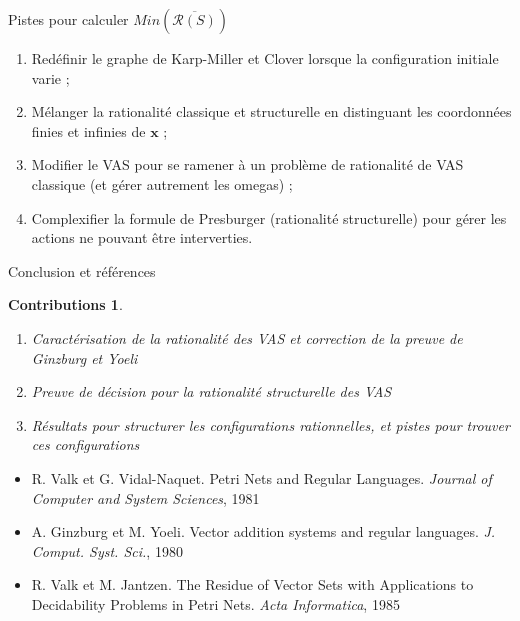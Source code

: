 \documentclass[french]{beamer}
\newcommand{\Min}{\textit{Min}}
\newcommand{\vect}[1]{\ensuremath{\mathbf{#1}}}
\newcommand{\inirat}{\mathcal{R}}
\newtheorem{summary}{Contributions}
\begin{document}
\begin{frame}{Pistes pour calculer $\Min(\overline{\inirat(S)})$}
\begin{enumerate}
    \item Redéfinir le graphe de Karp-Miller et Clover lorsque la configuration initiale varie ;
    \item Mélanger la rationalité classique et structurelle en distinguant les coordonnées finies et infinies de $\vect{x}$ ;
    \item Modifier le VAS pour se ramener à un problème de rationalité de VAS classique (et gérer autrement les omegas) ;
    \item Complexifier la formule de Presburger (rationalité structurelle) pour gérer les actions ne pouvant être interverties.
\end{enumerate}
\end{frame}

\begin{frame}{Conclusion et références}

\begin{summary}
\begin{enumerate}
    \item Caractérisation de la rationalité des VAS et correction de la preuve de Ginzburg et Yoeli
    \item Preuve de décision pour la rationalité structurelle des VAS
    \item Résultats pour structurer les configurations rationnelles, et pistes pour trouver ces configurations
\end{enumerate}
\end{summary}

\vspace{5mm}
\footnotesize{
\begin{itemize}
    \item R. Valk et G. Vidal-Naquet.
    Petri Nets and Regular Languages.
    \textit{Journal of Computer and System Sciences}, 1981
    
    \item A. Ginzburg et M. Yoeli.
	Vector addition systems and regular languages.
	\textit{J. Comput. Syst. Sci.}, 1980
	
	\item R. Valk et M. Jantzen.
	The Residue of Vector Sets with Applications to Decidability Problems in Petri Nets.
    \textit{Acta Informatica}, 1985
\end{itemize}
}
    
\end{frame}
\end{document}

